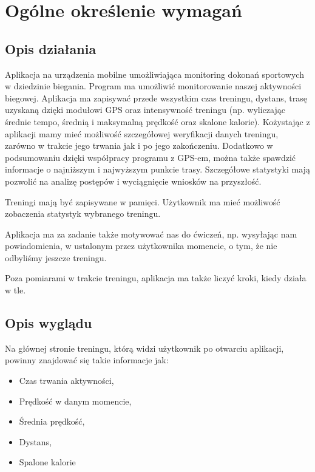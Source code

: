 	\newpage
\section{Ogólne określenie wymagań}		%




\subsection{Opis działania}  %

\hspace{0.60cm}Aplikacja na urządzenia mobilne umożliwiająca monitoring dokonań sportowych w dziedzinie biegania. Program ma umożliwić monitorowanie naszej aktywności biegowej. Aplikacja ma zapisywać przede wszystkim czas treningu, dystans, trasę uzyskaną dzięki modułowi GPS oraz intensywność treningu (np. wyliczając średnie tempo, średnią i maksymalną prędkość oraz skalone kalorie). Kożystając z aplikacji mamy mieć możliwość szczegółowej weryfikacji danych treningu, zarówno w trakcie jego trwania jak i po jego zakończeniu. Dodatkowo w podsumowaniu dzięki współpracy programu z GPS-em, można także spawdzić informacje o najniższym i najwyższym punkcie trasy. Szczegółowe statystyki mają pozwolić na analizę postępów i wyciągnięcie wniosków na przyszłość.

Treningi mają być zapisywane w pamięci. Użytkownik ma mieć możliwość zobaczenia statystyk wybranego treningu.

Aplikacja ma za zadanie także motywować nas do ćwiczeń, np. wysyłając nam powiadomienia, w ustalonym przez użytkownika momencie, o tym, że nie odbyliśmy jeszcze treningu.

Poza pomiarami w trakcie treningu, aplikacja ma także liczyć kroki, kiedy działa w tle.






\subsection{Opis wyglądu}  %


\hspace{0.60cm}Na głównej stronie treningu, którą widzi użytkownik po otwarciu aplikacji, powinny znajdować się takie informacje jak:
\begin{itemize}
	\item Czas trwania aktywności,
	\item Prędkość w danym momencie,
	\item Średnia prędkość,
	\item Dystans,
	\item Spalone kalorie
\end{itemize}

